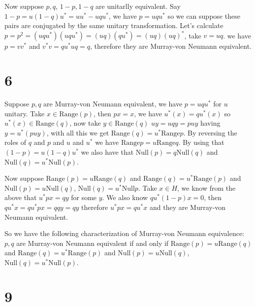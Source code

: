 \documentclass{article}
\begin{document}
Now suppose $p,q$, $1-p,1-q$ are unitarlly equivalent. Say $1-p=u(1-q)u^\ast=uu^\ast -uqu^\ast$, we have
$p=uqu^\ast$ so we can suppose these pairs are conjugated by the same unitary transformation. 
Let's calculate $p=p^2=(uqu^\ast)(uqu^\ast)=(uq)(qu^\ast)=(uq)(uq)^\ast $, take $v=uq$. we have $p=vv^\ast$
and $v^\ast v= qu^\ast u q=q$, therefore they are Murray-von Neumann equivalent.


\section*{6}

Suppose $p,q$ are Murray-von Neumann equivalent, we have $p=uqu^\ast$ for $u$ unitary. Take $x\in\text{Range}(p)$, then $px=x$,
we have $u^\ast(x)=qu^\ast(x)$ so $u^\ast(x)\in \text{Range}(q)$, now take $y\in \text{Range}(q)$ 
$uy=uqy=puy$ having $y=u^\ast(puy)$, with all this we get $\text{Range}(q)=u^\ast \text{Range}p$.
By reversing the roles of $q$ and $p$ and $u$ and $u^\ast$ we have $\text{Range}p=
u\text{Range}q$. By using that $(1-p)=u(1-q)u^\ast$ we also have that $\text{Null} (p)=q\text{Null}(q)$
and $\text{Null}(q)=u^\ast\text{Null}(p)$. 


Now suppose $\text{Range}(p)=u\text{Range}(q)$ and $\text{Range}(q)=u^\ast \text{Range}(p)$ 
and $\text{Null}(p)=u\text{Null}(q)$, $\text{Null}(q)=u^\ast\text{Null}{p}$.
Take $x\in H$, we know from the above that $u^\ast px=qy$ for some $y$. We also know 
$qu^\ast(1-p)x=0$, then $qu^\ast x=qu^\ast px=qqy=qy$ therefore $u^\ast px=qu^\ast x$ and they 
are Murray-von Neumann equivalent.


So we have the following characterization of Murray-von Neumann equivalence: $p,q$ are 
Murray-von Neumann equivalent if and only if $\text{Range}(p)=u\text{Range}(q)$ and $\text{Range}(q)=u^\ast \text{Range}(p)$ 
and $\text{Null}(p)=u\text{Null}(q)$, $\text{Null}(q)=u^\ast\text{Null}(p)$.



\section*{9}
\end{document}
